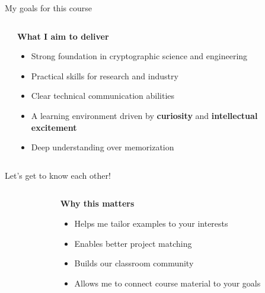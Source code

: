 \documentclass[aspectratio=169, lualatex, handout]{beamer}
\begin{document}
\begin{frame}{My goals for this course}
	\begin{columns}[c]
		\begin{column}{0.5\textwidth}
		\end{column}
		\begin{column}{0.5\textwidth}
			\textbf{What I aim to deliver}
			\begin{itemize}[<+->]
				\item Strong foundation in cryptographic science and engineering
				\item Practical skills for research and industry
				\item Clear technical communication abilities
				\item A learning environment driven by \textbf{curiosity} and \textbf{intellectual excitement}
				\item Deep understanding over memorization
			\end{itemize}
		\end{column}
	\end{columns}
\end{frame}

\begin{frame}{Let's get to know each other!}
	\begin{columns}[c]
		\begin{column}{0.5\textwidth}
		\end{column}
		\begin{column}{0.5\textwidth}
			\textbf{Why this matters}
			\begin{itemize}[<+->]
				\item Helps me tailor examples to your interests
				\item Enables better project matching
				\item Builds our classroom community
				\item Allows me to connect course material to your goals
			\end{itemize}
		\end{column}
	\end{columns}
\end{frame}

\begin{frame}[plain]
	\titlepage
\end{frame}
\end{document}
